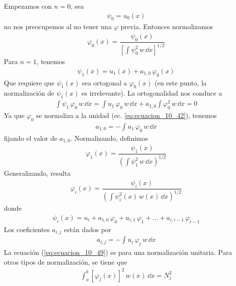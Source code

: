 Empezamos con $n = 0$, sea
\begin{align}
\psi_{0} = u_{0}(x)
\label{eq:ecuacion_10_41}
\end{align}
no nos preocupemos al no tener una $\varphi$ previa. Entonces normalizamos
\begin{align}
\varphi_{0}(x) = \dfrac{\psi_{0}(x)}{\left[ \displaystyle \int \psi_{0}^{2} \, w \, \dd{x} \right]^{1/2}}
\label{eq:ecuacion_10_42}
\end{align}
Para $n = 1$, tenemos
\begin{align}
\psi_{1}(x) = u_{1}(x) + a_{1,0} \, \varphi_{0}(x)
\label{eq:ecuacion_10_43}
\end{align}
Que requiere que $\psi_{1}(x)$ sea ortogonal a $\varphi_{0}(x)$ (en este punto, la normalización de $\psi_{1}(x)$ es irrelevante). La ortogonalidad nos conduce a
\begin{align}
\int \psi_{1} \, \varphi_{0} \, w \, \dd{x} = \int u_{1} \, \varphi_{0} \, w \, \dd{x} + a_{1,0} \int \varphi_{0}^{2} \, w \,  \dd{x} = 0
\label{eq:ecuacion_10_44}
\end{align}
Ya que $\varphi_{0}$ se normaliza a la unidad (ec. \ref{eq:ecuacion_10_42}), tenemos
\begin{align}
a_{1,0} = - \int u_{1} \, \varphi_{0} \, w \, \dd{x}
\label{eq:ecuacion_10_45}
\end{align}
fijando el valor de $a_{1, 0}$. Normalizando, definimos
\begin{align}
\varphi_{1} (x) = \dfrac{\psi_{1}(x)}{\left( \displaystyle \int \psi_{1}^{2} \, w \, \dd{x} \right)^{1/2}}
\label{eq:ecuacion_10_46}
\end{align}
Generalizando, resulta
\begin{align}
\varphi_{i}(x) = \dfrac{\psi_{i}(x)}{\left( \displaystyle \int \psi_{i}^{2}(x) \, w(x) \, \dd{x} \right)^{1/2}}
\label{eq:ecuacion_10_47}
\end{align}
donde
\begin{align}
\psi_{i}(x) = u_{i} + a_{1, 0} \, \varphi_{0} + a_{i, 1} \, \varphi_{1} + \ldots + a_{i, i-1} \, \varphi_{i-1}
\label{eq:ecuacion_10_48}
\end{align}
Los coeficientes $a_{i, j}$ están dados por
\begin{align}
a_{i, j} = - \int u_{i} \, \varphi_{j} \, w \, \dd{x}
\label{eq:ecuacion_10_49}
\end{align}
La ecuación (\ref{eq:ecuacion_10_49}) es para una normalización unitaria. Para otros tipos de normalización, se tiene que
\begin{align*}
\int_{a}^{b} \left[ \varphi_{j} (x) \right]^{2} \, w(x) \, \dd{x} =  N_{j}^{2}
\end{align*}
